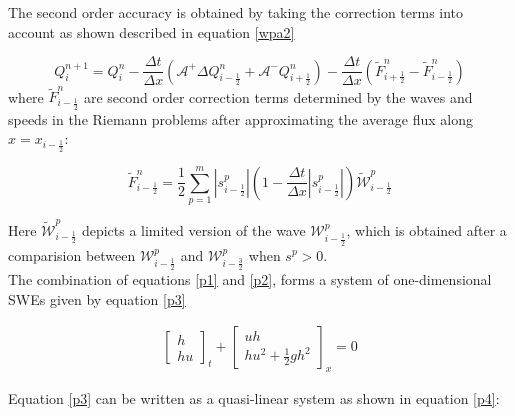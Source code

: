 \documentclass[12pt,a4paper]{article}
\begin{document}
	\noindent The second order accuracy is obtained by taking the correction terms into account as shown described in equation \eqref{wpa2}
	
	\begin{equation}
		Q_{i}^{n+1} =  Q_{i}^{n} - \frac{\Delta t}{\Delta x}(\mathcal{A^{+}}\Delta 	Q_{i-\frac{1}{2}}^{n} + \mathcal{A^{-}}Q_{i+\frac{1}{2}}^{n}) -  \frac{\Delta t}{\Delta x} (\tilde{F}_{i+\frac{1}{2}}^{n} - \tilde{F}_{i-\frac{1}{2}}^{n} )
		\label{wpa2}
	\end{equation}
	\noindent where $\tilde{F}_{i-\frac{1}{2}}^{n} $ are second order correction terms determined by the waves and speeds in the Riemann problems after approximating the average flux along  $x = x_{i - \frac{1}{2}}$:
	
	\begin{equation}
		\tilde{F}_{i-\frac{1}{2}}^{n} = \frac{1}{2} \sum_{p=1}^{m}  |s_{i- \frac{1}{2}}^{p}| \left( 1 - \frac{\Delta t}{\Delta x} |s_{i- \frac{1}{2}}^{p}|\right) \tilde{\mathcal{W}}_{i-\frac{1}{2}}^{p} 
		\label{wpa13}
	\end{equation}
	
	\noindent Here $\tilde{\mathcal{W}}_{i-\frac{1}{2}}^{p} $ depicts a limited version of the wave $\mathcal{W}_{i-\frac{1}{2}}^{p} $, which is obtained after a comparision between $\mathcal{W}_{i-\frac{1}{2}}^{p} $ and $\mathcal{W}_{i-\frac{3}{2}}^{p} $ when $s^{p} >0$.\\
	

		\noindent	The combination of equations \eqref{p1} and \eqref{p2}, forms a system of one-dimensional SWEs given by equation \eqref{p3}
	
	\begin{eqnarray}
		\begin{bmatrix} h \\ hu \end{bmatrix}_t + \begin{bmatrix} uh \\ hu^{2} + \frac{1}{2} gh^{2} \end{bmatrix}_x  = 0 
		\label{p3}
	\end{eqnarray}
	
	\noindent Equation \eqref{p3} can be written as a quasi-linear system as shown in equation \eqref{p4}:
	
\end{document}
